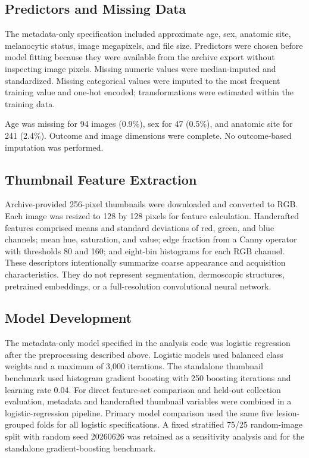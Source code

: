 \documentclass[11pt]{article}
\begin{document}
\subsection{Predictors and Missing Data}
The metadata-only specification included approximate age, sex, anatomic site, melanocytic status, image megapixels, and file size. Predictors were chosen before model fitting because they were available from the archive export without inspecting image pixels. Missing numeric values were median-imputed and standardized. Missing categorical values were imputed to the most frequent training value and one-hot encoded; transformations were estimated within the training data.

Age was missing for 94 images (0.9\%), sex for 47 (0.5\%), and anatomic site for 241 (2.4\%). Outcome and image dimensions were complete. No outcome-based imputation was performed.

\subsection{Thumbnail Feature Extraction}
Archive-provided 256-pixel thumbnails were downloaded and converted to RGB. Each image was resized to 128 by 128 pixels for feature calculation. Handcrafted features comprised means and standard deviations of red, green, and blue channels; mean hue, saturation, and value; edge fraction from a Canny operator with thresholds 80 and 160; and eight-bin histograms for each RGB channel. These descriptors intentionally summarize coarse appearance and acquisition characteristics. They do not represent segmentation, dermoscopic structures, pretrained embeddings, or a full-resolution convolutional neural network.

\subsection{Model Development}
The metadata-only model specified in the analysis code was logistic regression after the preprocessing described above. Logistic models used balanced class weights and a maximum of 3,000 iterations. The standalone thumbnail benchmark used histogram gradient boosting with 250 boosting iterations and learning rate 0.04. For direct feature-set comparison and held-out collection evaluation, metadata and handcrafted thumbnail variables were combined in a logistic-regression pipeline. Primary model comparison used the same five lesion-grouped folds for all logistic specifications. A fixed stratified 75/25 random-image split with random seed 20260626 was retained as a sensitivity analysis and for the standalone gradient-boosting benchmark.
\end{document}
